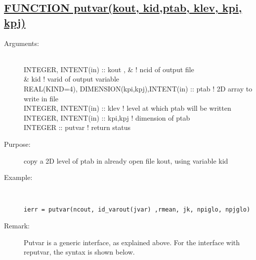 \documentclass[a4paper,11pt]{article}
\begin{document}
\subsection*{\underline{FUNCTION  putvar(kout, kid,ptab, klev, kpi, kpj)   }}
\begin{description}
\item[Arguments:] \ \\
       INTEGER, INTENT(in) :: kout  ,  \&       ! ncid of output file  \\
           \&                  kid              ! varid of output variable \\
       REAL(KIND=4), DIMENSION(kpi,kpj),INTENT(in) :: ptab ! 2D array to write in file \\
       INTEGER, INTENT(in) :: klev             ! level at which ptab will be written \\
       INTEGER, INTENT(in) :: kpi,kpj          ! dimension of ptab \\
       INTEGER :: putvar                       ! return status
\item[Purpose:]  copy a 2D level of ptab in already open file kout, using variable kid
\item[Example:]\ \\
\begin{verbatim}
ierr = putvar(ncout, id_varout(jvar) ,rmean, jk, npiglo, npjglo)
\end{verbatim}
\item[Remark:] Putvar is a generic interface, as explained above. For the interface with reputvar, the syntax is shown below.
\end{description}
\end{document}
